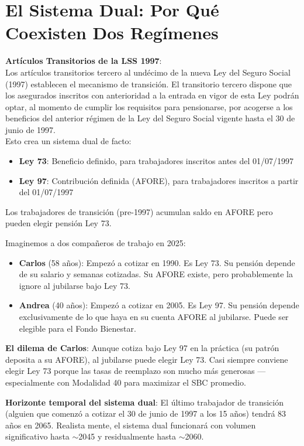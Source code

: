 \documentclass[11pt,a4paper]{report}
\begin{document}
\section{El Sistema Dual: Por Qu\'e Coexisten Dos Reg\'imenes}

\begin{tcolorbox}[colback=blue!5!white, colframe=blue!75!black, title=\textbf{Definici\'on Formal}]
\textbf{Art\'iculos Transitorios de la LSS 1997}:\\[0.3em]
Los art\'iculos transitorios tercero al und\'ecimo de la nueva Ley del Seguro Social (1997) establecen el mecanismo de transici\'on. El transitorio tercero dispone que los asegurados inscritos con anterioridad a la entrada en vigor de esta Ley podr\'an optar, al momento de cumplir los requisitos para pensionarse, por acogerse a los beneficios del anterior r\'egimen de la Ley del Seguro Social vigente hasta el 30 de junio de 1997.\\[0.3em]
Esto crea un sistema dual de facto:
\begin{itemize}[nosep]
\item \textbf{Ley 73}: Beneficio definido, para trabajadores inscritos antes del 01/07/1997
\item \textbf{Ley 97}: Contribuci\'on definida (AFORE), para trabajadores inscritos a partir del 01/07/1997
\end{itemize}
Los trabajadores de transici\'on (pre-1997) acumulan saldo en AFORE pero pueden elegir pensi\'on Ley 73.
\end{tcolorbox}

\begin{tcolorbox}[colback=green!5!white, colframe=green!50!black, title=\textbf{Intuici\'on}]
Imaginemos a dos compa\~neros de trabajo en 2025:
\begin{itemize}[nosep]
\item \textbf{Carlos} (58 a\~nos): Empez\'o a cotizar en 1990. Es Ley 73. Su pensi\'on depende de su salario y semanas cotizadas. Su AFORE existe, pero probablemente la ignore al jubilarse bajo Ley 73.
\item \textbf{Andrea} (40 a\~nos): Empez\'o a cotizar en 2005. Es Ley 97. Su pensi\'on depende exclusivamente de lo que haya en su cuenta AFORE al jubilarse. Puede ser elegible para el Fondo Bienestar.
\end{itemize}

\textbf{El dilema de Carlos}: Aunque cotiza bajo Ley 97 en la pr\'actica (su patr\'on deposita a su AFORE), al jubilarse puede elegir Ley 73. Casi siempre conviene elegir Ley 73 porque las tasas de reemplazo son mucho m\'as generosas ---especialmente con Modalidad 40 para maximizar el SBC promedio.

\textbf{Horizonte temporal del sistema dual}: El \'ultimo trabajador de transici\'on (alguien que comenz\'o a cotizar el 30 de junio de 1997 a los 15 a\~nos) tendr\'a 83 a\~nos en 2065. Realista mente, el sistema dual funcionar\'a con volumen significativo hasta $\sim$2045 y residualmente hasta $\sim$2060.
\end{tcolorbox}
\end{document}

